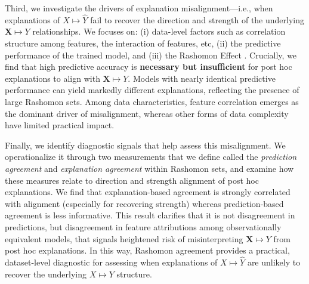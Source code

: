 \documentclass[11pt]{article}
\begin{document}
Third, we investigate the drivers of explanation misalignment—i.e., when explanations of $X\mapsto\hat{Y}$ fail to recover the direction and strength of the underlying $\mathbf{X}\mapsto Y$ relationships. We focuses on:  (i) data-level factors such as correlation structure among features, the interaction of features, etc, (ii) the predictive performance of the trained model, and (iii) the Rashomon Effect \citep{semenova22rashomon, paes23inevitable}. Crucially, we find that high predictive accuracy is \textbf{necessary but insufficient} for post hoc explanations to align with $\mathbf{X}\mapsto Y$. Models with nearly identical predictive performance can yield markedly different explanations, reflecting the presence of large Rashomon sets. Among data characteristics, feature correlation emerges as the dominant driver of misalignment, whereas other forms of data complexity have limited practical impact.

Finally, we identify diagnostic signals that help assess this misalignment. %
We operationalize it through two measurements that we define called the \emph{prediction agreement} and \emph{explanation agreement} within Rashomon sets, and examine how these measures relate to direction and strength alignment of post hoc explanations. We find that explanation-based agreement is strongly correlated with alignment (especially for recovering strength) whereas prediction-based agreement is  less informative. This result clarifies that it is not disagreement in predictions, but disagreement in feature attributions among observationally equivalent models, that signals heightened risk of misinterpreting $\mathbf{X}\mapsto Y$ from post hoc explanations. In this way, Rashomon agreement provides a practical, dataset-level diagnostic for assessing when explanations of $X\mapsto\hat{Y}$ are unlikely to recover the underlying $X \mapsto Y$ structure.



\end{document}
